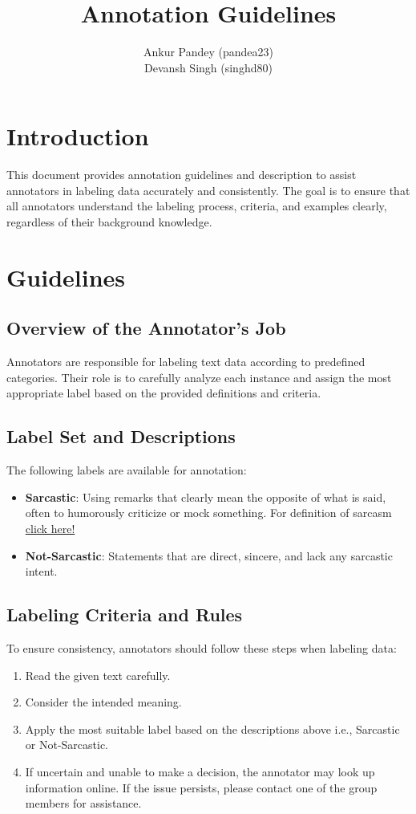 \documentclass[12pt]{article}
\title{Annotation Guidelines}
\author{
    Ankur Pandey (pandea23) \\ 
    Devansh Singh (singhd80)
}
\date{}
\begin{document}
\maketitle

\section{Introduction}
This document provides annotation guidelines and description to assist annotators in labeling data accurately and consistently. The goal is to ensure that all annotators understand the labeling process, criteria, and examples clearly, regardless of their background knowledge.

\section{Guidelines}

\subsection{Overview of the Annotator's Job}
Annotators are responsible for labeling text data according to predefined categories. Their role is to carefully analyze each instance and assign the most appropriate label based on the provided definitions and criteria.

\subsection{Label Set and Descriptions}
The following labels are available for annotation:

\begin{itemize}
    \item \textbf{Sarcastic}: Using remarks that clearly mean the opposite of what is said, often to humorously criticize or mock something. For definition of sarcasm \href{https://en.wikipedia.org/wiki/Sarcasm}{click here!}
    \item \textbf{Not-Sarcastic}: Statements that are direct, sincere, and lack any sarcastic intent.
\end{itemize}

\subsection{Labeling Criteria and Rules}
To ensure consistency, annotators should follow these steps when labeling data:

\begin{enumerate}
    \item Read the given text carefully.
    \item Consider the intended meaning.
    \item Apply the most suitable label based on the descriptions above i.e., Sarcastic or Not-Sarcastic. 
    \item If uncertain and unable to make a decision, the annotator may look up information online. If the issue persists, please contact one of the group members for assistance.
\end{enumerate}
\end{document}
